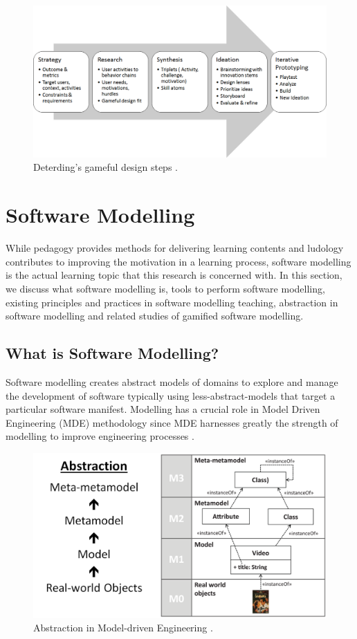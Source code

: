 \documentclass[12pt, a4paper]{report}
\begin{document}
{\begin{figure}[ht]
\centering
\includegraphics[width=14cm]{gameful-steps}
\caption{Deterding's gameful design steps \cite{deterding2015lens}.}
\label{fig:gameful-steps}
\end{figure}


\section{Software Modelling}
While pedagogy provides methods for delivering learning contents and ludology contributes to improving the motivation in a learning process, software modelling is the actual learning topic that this research is concerned with. In this section, we discuss what software modelling is, tools to perform software modelling, existing principles and practices in software modelling teaching, abstraction in software modelling and related studies of gamified software modelling.    

\subsection{What is Software Modelling?}
Software modelling creates abstract models of domains to explore and manage the development of software typically using less-abstract-models that target a particular software manifest. Modelling has a crucial role in Model Driven Engineering (MDE) methodology since MDE harnesses greatly the strength of modelling to improve engineering processes \cite{brambilla2012model}.  

\begin{figure}[!b]
\centering
\includegraphics[width=13cm]{abstraction}
\caption{Abstraction in Model-driven Engineering \cite{brambilla2012model}.}
\label{abstraction}
\end{figure}

}
\end{document}
